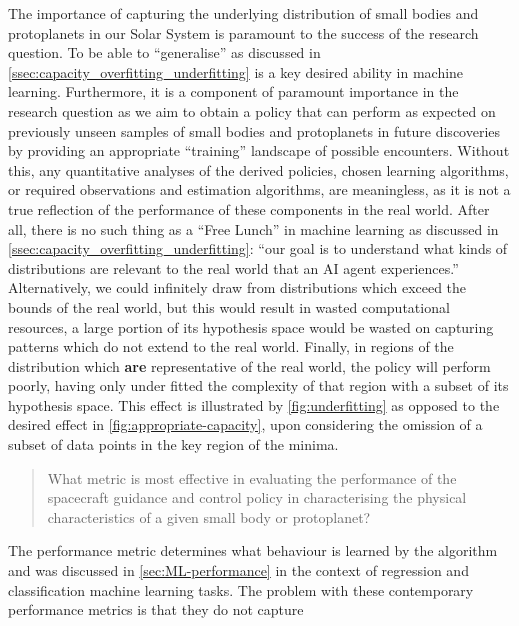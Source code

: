 The importance of capturing the underlying distribution of small bodies and protoplanets in our Solar System is paramount to the success of the research question. To be able to ``generalise'' as discussed in \autoref{ssec:capacity_overfitting_underfitting} is a key desired ability in machine learning. Furthermore, it is a component of paramount importance in the research question as we aim to obtain a policy that can perform as expected on previously unseen samples of small bodies and protoplanets in future discoveries by providing an appropriate ``training'' landscape of possible encounters. Without this, any quantitative analyses of the derived policies, chosen learning algorithms, or required observations and estimation algorithms, are meaningless, as it is not a true reflection of the performance of these components in the real world. After all, there is no such thing as a ``Free Lunch'' in machine learning as discussed in \autoref{ssec:capacity_overfitting_underfitting}: ``our goal is to understand what kinds of distributions are relevant to the real world that an \gls{AI} agent experiences.'' Alternatively, we could infinitely draw from distributions which exceed the bounds of the real world, but this would result in wasted computational resources, a large portion of its hypothesis space would be wasted on capturing patterns which do not extend to the real world. Finally, in regions of the distribution which \textbf{are} representative of the real world, the policy will perform poorly, having only under fitted the complexity of that region with a subset of its hypothesis space. This effect is illustrated by \autoref{fig:underfitting} as opposed to the desired effect in \autoref{fig:appropriate-capacity}, upon considering the omission of a subset of data points in the key region of the minima. 

\begin{quote}
    What metric is most effective in evaluating the performance of the spacecraft guidance and control policy in characterising the physical characteristics of a given small body or protoplanet?
\end{quote}



The performance metric determines what behaviour is learned by the algorithm and was discussed in \autoref{sec:ML-performance} in the context of regression and classification machine learning tasks. The problem with these contemporary performance metrics is that they do not capture 

